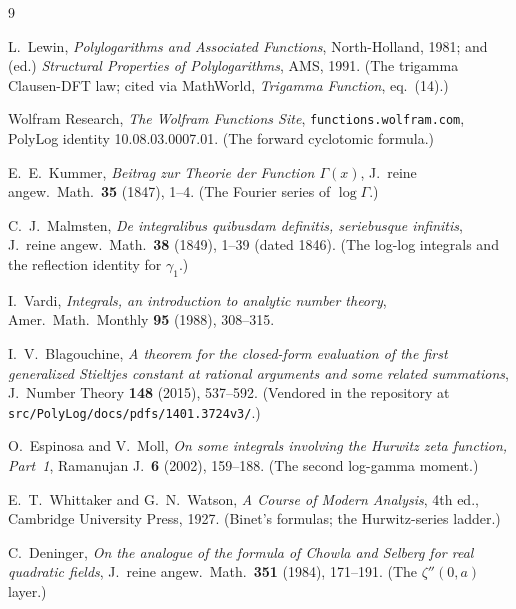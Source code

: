 \documentclass[11pt]{article}
\theoremstyle{remark}
\begin{document}
\begin{thebibliography}{9}

L.~Lewin, \emph{Polylogarithms and Associated Functions}, North-Holland, 1981; and (ed.)
\emph{Structural Properties of Polylogarithms}, AMS, 1991. (The trigamma Clausen-DFT law;
cited via MathWorld, \emph{Trigamma Function}, eq.~(14).)

Wolfram Research, \emph{The Wolfram Functions Site}, \texttt{functions.wolfram.com},
PolyLog identity 10.08.03.0007.01. (The forward cyclotomic formula.)

E.~E.~Kummer, \emph{Beitrag zur Theorie der Function
$\Gamma(x)$}, J.~reine angew.\ Math.\ \textbf{35} (1847), 1--4. (The Fourier series of
$\log\Gamma$.)

C.~J.~Malmsten, \emph{De integralibus quibusdam definitis, seriebusque infinitis},
J.~reine angew.\ Math.\ \textbf{38} (1849), 1--39 (dated 1846). (The log-log integrals and
the reflection identity for $\gamma_1$.)

I.~Vardi, \emph{Integrals, an introduction to analytic number theory}, Amer.\ Math.\
Monthly \textbf{95} (1988), 308--315.

I.~V.~Blagouchine, \emph{A theorem for the closed-form evaluation of the first generalized
Stieltjes constant at rational arguments and some related summations}, J.~Number Theory
\textbf{148} (2015), 537--592. (Vendored in the repository at
\texttt{src/PolyLog/docs/pdfs/1401.3724v3/}.)

O.~Espinosa and V.~Moll, \emph{On some integrals involving the Hurwitz zeta function,
Part~1}, Ramanujan J.\ \textbf{6} (2002), 159--188. (The second log-gamma moment.)

E.~T.~Whittaker and G.~N.~Watson, \emph{A Course of Modern Analysis}, 4th ed., Cambridge
University Press, 1927. (Binet's formulas; the Hurwitz-series ladder.)

C.~Deninger, \emph{On the analogue of the formula of Chowla and Selberg for real quadratic
fields}, J.~reine angew.\ Math.\ \textbf{351} (1984), 171--191. (The $\zeta''(0,a)$
layer.)

\end{thebibliography}
\end{document}
